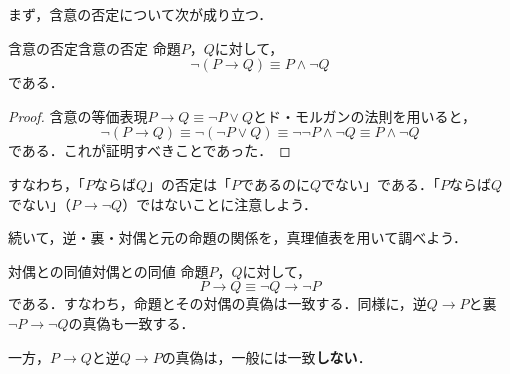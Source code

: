 まず，含意の否定について次が成り立つ．

\begin{prop}{含意の否定}{含意の否定}
  命題$P$，$Q$に対して，
  \[
    \lnot ( P \to Q ) \equiv P \land \lnot Q
  \]
  である．
\end{prop}

\begin{tleftbar}
  \begin{proof}
    含意の等価表現$P \to Q \equiv \lnot P \lor Q$とド・モルガンの法則を用いると，
    \[
      \lnot ( P \to Q )
      \equiv \lnot ( \lnot P \lor Q )
      \equiv \lnot \lnot P \land \lnot Q
      \equiv P \land \lnot Q
    \]
    である．これが証明すべきことであった．
  \end{proof}
\end{tleftbar}

すなわち，「$P$ならば$Q$」の否定は「$P$であるのに$Q$でない」である．「$P$ならば$Q$でない」（$P \to \lnot Q$）ではないことに注意しよう．

続いて，逆・裏・対偶と元の命題の関係を，真理値表を用いて調べよう．

\begin{prop}{対偶との同値}{対偶との同値}
  命題$P$，$Q$に対して，
  \[
    P \to Q \equiv \lnot Q \to \lnot P
  \]
  である．すなわち，命題とその対偶の真偽は一致する．同様に，逆$Q \to P$と裏$\lnot P \to \lnot Q$の真偽も一致する．

  一方，$P \to Q$と逆$Q \to P$の真偽は，一般には一致\textbf{しない}．
\end{prop}

